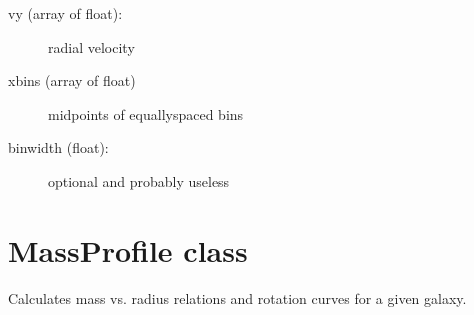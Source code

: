 \documentclass[letterpaper,10pt,english]{sphinxmanual}
\begin{document}
\begin{fulllineitems}
\begin{fulllineitems}
\begin{description}
\begin{description}
\item[{vy (array of float):}] \leavevmode
radial velocity

\item[{xbins (array of float)}] \leavevmode
midpoints of equally\sphinxhyphen{}spaced bins

\item[{binwidth (float):}] \leavevmode
optional and probably useless

\end{description}

\end{description}

\end{fulllineitems}


\end{fulllineitems}

\label{\detokenize{massprofile:module-galaxy.massprofile}}

\chapter{MassProfile class}
\label{\detokenize{massprofile:massprofile-class}}\label{\detokenize{massprofile::doc}}
Calculates mass vs. radius relations and rotation curves for a given galaxy.
\end{document}
